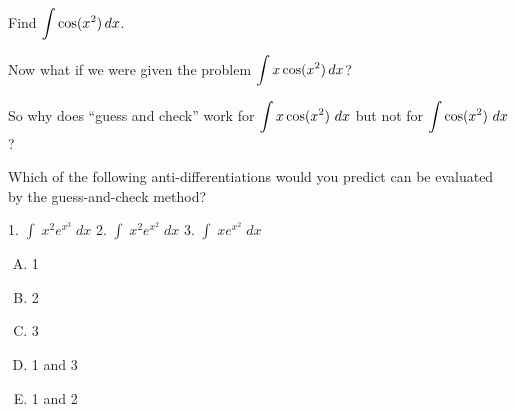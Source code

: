 \newpage
\begin{problem}
	Find $\displaystyle \int \cos (x^2)\,dx$.
	
\end{problem}

\newpage

\begin{problem}
Now what if we were given the problem $\displaystyle \int x\cos (x^2)\,dx$?
\end{problem}


\vfill

So why does ``guess and check'' work for $\displaystyle \int x \cos(x^2)~dx$ but
not for $\displaystyle \int \cos(x^2)~dx$?
\vspace{1in}


\newpage
\begin{problem}
  Which of the following anti-differentiations would you predict can
  be evaluated by the guess-and-check method? \\[2ex]
\begin{center}
1. $\displaystyle \int\;  x^2 e^{x^3}   \;dx$\hfill
2. $\displaystyle \int\; x^2 e^{x^2}   \;dx$\hfill
3. $\displaystyle \int\;  x e^{x^2}   \;dx$  \\[2ex]
\end{center}
\begin{enumerate}[A.]
\item 1 \\[1ex]
\item 2 \\[1ex]
\item 3 \\[1ex]
\item 1 and 3 \\[1ex]
\item 1 and 2
\end{enumerate}
\end{problem}

